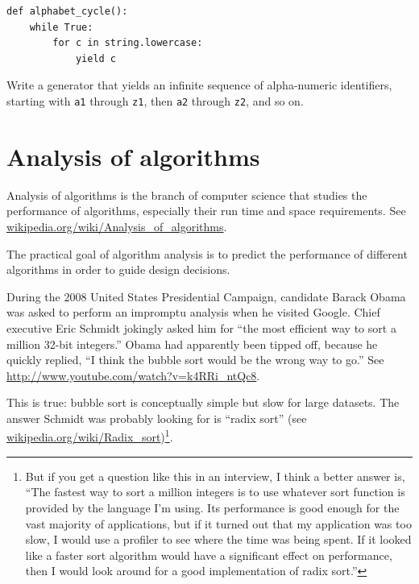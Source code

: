 \documentclass[10pt]{book}
\begin{document}
\begin{verbatim}
def alphabet_cycle():
    while True:
        for c in string.lowercase:
            yield c
\end{verbatim}


\begin{ex}

Write a generator that yields an infinite sequence of alpha-numeric
identifiers, starting with {\tt a1} through {\tt z1}, then {\tt a2}
through {\tt z2}, and so on.

\end{ex}


\chapter{Analysis of algorithms}

Analysis of algorithms is the branch of computer science that studies
the performance of algorithms, especially their run time and space
requirements.  See \url{wikipedia.org/wiki/Analysis_of_algorithms}.


The practical goal of algorithm analysis is to predict the performance
of different algorithms in order to guide design decisions.

During the 2008 United States Presidential Campaign, candidate
Barack Obama was asked to perform an impromptu analysis when
he visited Google.  Chief executive Eric Schmidt jokingly asked him
for ``the most efficient way to sort a million 32-bit integers.''
Obama had apparently been tipped off, because he quickly
replied, ``I think the bubble sort would be the wrong way to go.''
See \url{http://www.youtube.com/watch?v=k4RRi_ntQc8}.

This is true: bubble sort is conceptually simple but slow for
large datasets.  The answer Schmidt was probably looking for is
``radix sort'' (see \url{wikipedia.org/wiki/Radix_sort})\footnote{
But if you get a question like this in an interview, I think
a better answer is, ``The fastest way to sort a million integers
is to use whatever sort function is provided by the language
I'm using.  Its performance is good enough for the vast majority
of applications, but if it turned out that my application was too
slow, I would use a profiler to see where the time was being
spent.  If it looked like a faster sort algorithm would have
a significant effect on performance, then I would look
around for a good implementation of radix sort.''}.
\end{document}
